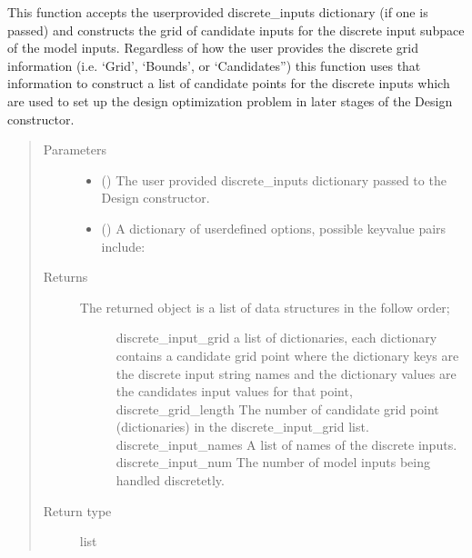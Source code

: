 \documentclass[letterpaper,10pt,english,openany,oneside]{sphinxmanual}
\begin{document}
\begin{fulllineitems}
\begin{fulllineitems}
This function accepts the user\sphinxhyphen{}provided discrete\_inputs dictionary (if one is passed) and
constructs the grid of candidate inputs for the discrete input subpace of the model inputs.
Regardless of how the user provides the discrete grid information (i.e. ‘Grid’, ‘Bounds’, or
‘Candidates”) this function uses that information to construct a list of candidate points
for the discrete inputs which are used to set up the design optimization problem in later
stages of the Design constructor.
\begin{quote}\begin{description}
\item[{Parameters}] \leavevmode\begin{itemize}
\item {} 
 () \textendash{} The user provided discrete\_inputs dictionary passed to the
Design constructor.

\item {} 
 (\sphinxstyleliteralemphasis{\sphinxupquote{, }}) \textendash{} A dictionary of user\sphinxhyphen{}defined options, possible key\sphinxhyphen{}value
pairs include:

\end{itemize}

\item[{Returns}] \leavevmode
\begin{description}
\item[{The returned object is a list of data structures in the follow order;}] \leavevmode
discrete\_input\_grid \textendash{} a list of dictionaries, each dictionary contains a candidate
grid point where the dictionary keys are the discrete input string names and
the dictionary values are the candidates input values for that point,
discrete\_grid\_length \textendash{} The number of candidate grid point (dictionaries) in the
discrete\_input\_grid list.
discrete\_input\_names \textendash{} A list of names of the discrete inputs.
discrete\_input\_num \textendash{} The number of model inputs being handled discretetly.

\end{description}


\item[{Return type}] \leavevmode
list


\end{description}
\end{quote}
\end{fulllineitems}
\end{fulllineitems}
\end{document}
